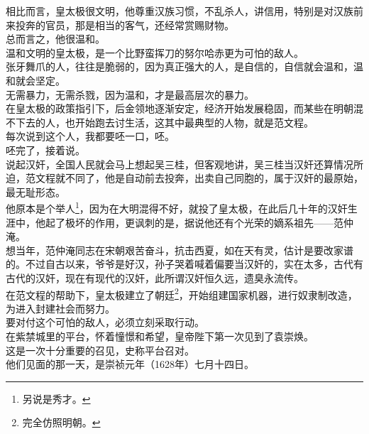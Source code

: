 \begin{multicols}{\theparacolNo}
相比而言，皇太极很文明，他尊重汉族习惯，不乱杀人，讲信用，特别是对汉族前来投奔的官员，那是相当的客气，还经常赏赐财物。\\

总而言之，他很温和。\\

温和文明的皇太极，是一个比野蛮挥刀的努尔哈赤更为可怕的敌人。\\

张牙舞爪的人，往往是脆弱的，因为真正强大的人，是自信的，自信就会温和，温和就会坚定。\\

无需暴力，无需杀戮，因为温和，才是最高层次的暴力。\\

在皇太极的政策指引下，后金领地逐渐安定，经济开始发展稳固，而某些在明朝混不下去的人，也开始跑去讨生活，这其中最典型的人物，就是范文程。\\

每次说到这个人，我都要呸一口，呸。\\

呸完了，接着说。\\

说起汉奸，全国人民就会马上想起吴三桂，但客观地讲，吴三桂当汉奸还算情况所迫，范文程就不同了，他是自动前去投奔，出卖自己同胞的，属于汉奸的最原始，最无耻形态。\\

他原本是个举人\footnote{另说是秀才。}，因为在大明混得不好，就投了皇太极，在此后几十年的汉奸生涯中，他起了极坏的作用，更讽刺的是，据说他还有个光荣的嫡系祖先——范仲淹。\\

想当年，范仲淹同志在宋朝艰苦奋斗，抗击西夏，如在天有灵，估计是要改家谱的。不过自古以来，爷爷是好汉，孙子哭着喊着偏要当汉奸的，实在太多，古代有古代的汉奸，现在有现代的汉奸，此所谓汉奸恒久远，遗臭永流传。\\

在范文程的帮助下，皇太极建立了朝廷\footnote{完全仿照明朝。}，开始组建国家机器，进行奴隶制改造，为进入封建社会而努力。\\

要对付这个可怕的敌人，必须立刻采取行动。\\

在紫禁城里的平台，怀着憧憬和希望，皇帝陛下第一次见到了袁崇焕。\\

这是一次十分重要的召见，史称平台召对。\\

他们见面的那一天，是崇祯元年（1628年）七月十四日。\\


\end{multicols}
